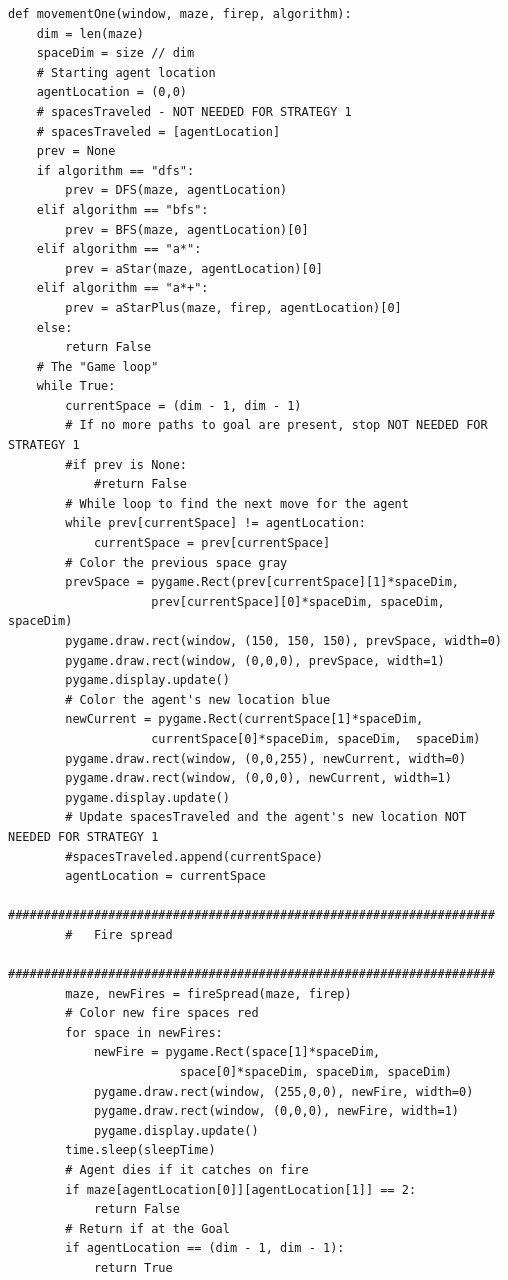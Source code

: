 \documentclass[11pt]{article}
\begin{document}
\begin{verbatim}
def movementOne(window, maze, firep, algorithm):
    dim = len(maze)
    spaceDim = size // dim
    # Starting agent location
    agentLocation = (0,0)
    # spacesTraveled - NOT NEEDED FOR STRATEGY 1
    # spacesTraveled = [agentLocation]
    prev = None
    if algorithm == "dfs":
        prev = DFS(maze, agentLocation)
    elif algorithm == "bfs":
        prev = BFS(maze, agentLocation)[0]
    elif algorithm == "a*":
        prev = aStar(maze, agentLocation)[0]
    elif algorithm == "a*+":
        prev = aStarPlus(maze, firep, agentLocation)[0]
    else:
        return False
    # The "Game loop"
    while True:
        currentSpace = (dim - 1, dim - 1)
        # If no more paths to goal are present, stop NOT NEEDED FOR STRATEGY 1
        #if prev is None:
            #return False
        # While loop to find the next move for the agent
        while prev[currentSpace] != agentLocation:
            currentSpace = prev[currentSpace]
        # Color the previous space gray
        prevSpace = pygame.Rect(prev[currentSpace][1]*spaceDim, 
        			prev[currentSpace][0]*spaceDim, spaceDim, spaceDim)
        pygame.draw.rect(window, (150, 150, 150), prevSpace, width=0)
        pygame.draw.rect(window, (0,0,0), prevSpace, width=1)
        pygame.display.update()
        # Color the agent's new location blue
        newCurrent = pygame.Rect(currentSpace[1]*spaceDim,
        			currentSpace[0]*spaceDim, spaceDim,  spaceDim)
        pygame.draw.rect(window, (0,0,255), newCurrent, width=0)
        pygame.draw.rect(window, (0,0,0), newCurrent, width=1)
        pygame.display.update()
        # Update spacesTraveled and the agent's new location NOT NEEDED FOR STRATEGY 1
        #spacesTraveled.append(currentSpace)
        agentLocation = currentSpace
        ####################################################################
        #   Fire spread
        ####################################################################
        maze, newFires = fireSpread(maze, firep)
        # Color new fire spaces red
        for space in newFires:
            newFire = pygame.Rect(space[1]*spaceDim, 
            			space[0]*spaceDim, spaceDim, spaceDim)
            pygame.draw.rect(window, (255,0,0), newFire, width=0)
            pygame.draw.rect(window, (0,0,0), newFire, width=1)
            pygame.display.update()
        time.sleep(sleepTime)
        # Agent dies if it catches on fire
        if maze[agentLocation[0]][agentLocation[1]] == 2:
            return False
        # Return if at the Goal
        if agentLocation == (dim - 1, dim - 1):
            return True
\end{verbatim}
\end{document}
